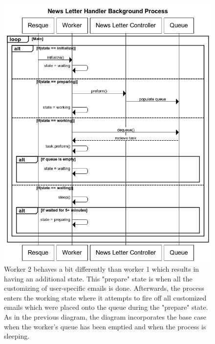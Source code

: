 \begin{figure}
\centering
\includegraphics[width=5.5in]{./Diagrams/ComponentModels/stateMachineDiagrams/Worker2/worker2.png}
\caption{Worker 2 behaves a bit differently than worker 1 which results in having an additional state. This "prepare" state is when all the customizing of user-specific emails is done. Afterwards, the process enters the working state where it attempts to fire off all customized emails which were placed onto the queue during the "prepare" state. As in the previous diagram, the diagram incorporates the base case when the worker's queue has been emptied and when the process is sleeping.}
\end{figure}

